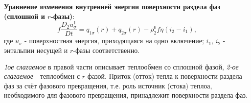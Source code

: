 \documentclass[12pt, a4paper]{report}
\begin{document}
	\textbf{Уравнение изменения внутренней энергии поверхности раздела фаз (сплошной и $r$-фазы)}:
	\begin{equation*}
		f \frac{D_{2} u_{\sigma}^{1}}{Dt} = q_{1 \sigma}(r) + q_{2 \sigma}(r) - \rho_{2}^{0} f \eta (i_{2} - i_{1}),
	\end{equation*}
	где $u_{\sigma}$ - поверхностная энергия, приходящаяся на одно включение; $i_{1}$, $i_{2}$ - энтальпии несущей и $r$-фазы соответственно. \par
	\textit{1ое слагаемое} в правой части описывает теплообмен со сплошной фазой, \textit{2-ое слагаемое} - теплообмен с $r$-фазой. Приток (отток) тепла к поверхности раздела фаз за счёт фазового превращения, т.е. роль источник (стока) теплоа, необходимого для фазового превращения, принадлежит поверхности раздела фаз.
\end{document}

